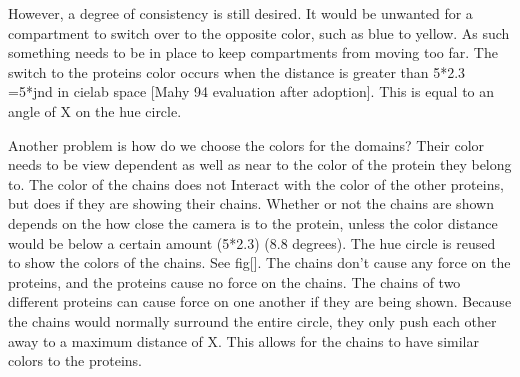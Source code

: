 \documentclass[review,journal]{vgtc}         %
\begin{document}
However, a degree of consistency is still desired. It would be unwanted for a compartment to switch over to the opposite color, such as blue to yellow.  As such something needs to be in place to keep compartments from moving too far.
The switch to the proteins color occurs when the distance is greater than 5*2.3 =5*jnd in cielab space [Mahy 94 evaluation after adoption]. This is equal to an angle of X on the hue circle.

Another problem is how do we choose the colors for the domains? Their color needs to be view dependent as well as near to the color of the protein they belong to. The color of the chains does not  
Interact with the color of the other proteins, but does if they are showing their chains. 
Whether or not the chains are shown depends on the how close the camera is to the protein, unless the color distance would be below a certain amount (5*2.3) (8.8 degrees). The hue circle is reused to show the colors of the chains. See fig[]. The chains don’t cause any force on the proteins, and the proteins cause no force on the chains. The chains of two different proteins can cause force on one another if they are being shown. Because the chains would normally surround the entire circle, they only push each other away to a maximum distance of X. This allows for the chains to have similar colors to the proteins.
\end{document}
